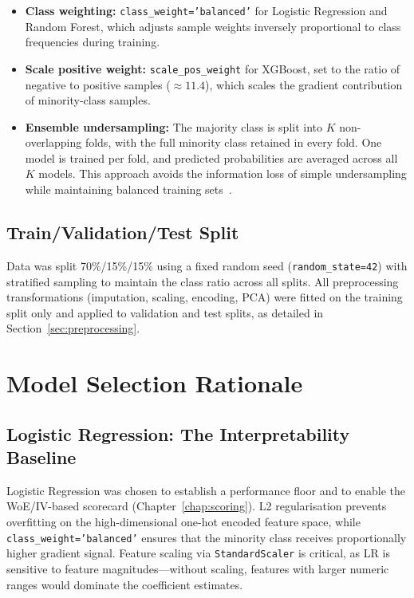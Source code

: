 \begin{itemize}
    \item \textbf{Class weighting:} \texttt{class\_weight='balanced'} for Logistic Regression and Random Forest, which adjusts sample weights inversely proportional to class frequencies during training.
    \item \textbf{Scale positive weight:} \texttt{scale\_pos\_weight} for XGBoost, set to the ratio of negative to positive samples ($\approx 11.4$), which scales the gradient contribution of minority-class samples.
    \item \textbf{Ensemble undersampling:} The majority class is split into $K$ non-overlapping folds, with the full minority class retained in every fold. One model is trained per fold, and predicted probabilities are averaged across all $K$ models. This approach avoids the information loss of simple undersampling while maintaining balanced training sets~\cite{chawla2002}.
\end{itemize}

\subsection{Train/Validation/Test Split}

Data was split 70\%/15\%/15\% using a fixed random seed (\texttt{random\_state=42}) with stratified sampling to maintain the class ratio across all splits. All preprocessing transformations (imputation, scaling, encoding, PCA) were fitted on the training split only and applied to validation and test splits, as detailed in Section~\ref{sec:preprocessing}.

\section{Model Selection Rationale}
\label{sec:model_rationale}

\subsection{Logistic Regression: The Interpretability Baseline}

Logistic Regression was chosen to establish a performance floor and to enable the WoE/IV-based scorecard (Chapter~\ref{chap:scoring}). L2 regularisation prevents overfitting on the high-dimensional one-hot encoded feature space, while \texttt{class\_weight='balanced'} ensures that the minority class receives proportionally higher gradient signal. Feature scaling via \texttt{StandardScaler} is critical, as LR is sensitive to feature magnitudes---without scaling, features with larger numeric ranges would dominate the coefficient estimates.

